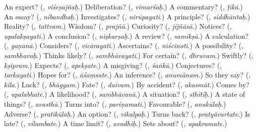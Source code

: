 \begin{tcolorbox}[breakable,colback=teal!4,colframe=teal!35!black,title={Before you move on}]
An expert? (\textbf{}, \emph{viśeṣajñaḥ}.) Deliberation? (\textbf{}, \emph{vimarśaḥ}.) A commentary? (\textbf{}, \emph{ṭīkā}.) An essay? (\textbf{}, \emph{nibandhaḥ}.) Investigates? (\textbf{}, \emph{nirūpayati}.) A principle? (\textbf{}, \emph{siddhāntaḥ}.) Reality? (\textbf{}, \emph{tattvam}.) Wisdom? (\textbf{}, \emph{prajñā}.) Curiosity? (\textbf{}, \emph{jijñāsā}.) Notices? (\textbf{}, \emph{upalakṣayati}.) A conclusion? (\textbf{}, \emph{niṣkarṣaḥ}.) A review? (\textbf{}, \emph{samīkṣā}.) A calculation? (\textbf{}, \emph{gaṇanā}.) Considers? (\textbf{}, \emph{vicārayati}.) Ascertains? (\textbf{}, \emph{niścinoti}.) A possibility? (\textbf{}, \emph{sambhavaḥ}.) Thinks likely? (\textbf{}, \emph{sambhāvayati}.) For certain? (\textbf{}, \emph{dhruvam}.) Swiftly? (\textbf{}, \emph{kṣipram}.) Expects? (\textbf{}, \emph{apekṣate}.) A misgiving? (\textbf{}, \emph{śaṅkā}.) Conjectures? (\textbf{}, \emph{tarkayati}.) Hopes for? (\textbf{}, \emph{āśaṃsate}.) An inference? (\textbf{}, \emph{anumānam}.) So they say? (\textbf{}, \emph{kila}.) Luck? (\textbf{}, \emph{bhāgyam}.) Fate? (\textbf{}, \emph{daivam}.) By accident? (\textbf{}, \emph{akasmāt}.) Comes by? (\textbf{}, \emph{upalabhate}.) A likelihood? (\textbf{}, \emph{sambhāvanā}.) A situation? (\textbf{}, \emph{sthitiḥ}.) A state of things? (\textbf{}, \emph{avasthā}.) Turns into? (\textbf{}, \emph{pariṇamati}.) Favourable? (\textbf{}, \emph{anukūlaḥ}.) Adverse? (\textbf{}, \emph{pratikūlaḥ}.) An option? (\textbf{}, \emph{vikalpaḥ}.) Turns back? (\textbf{}, \emph{pratyāvartate}.) Is late? (\textbf{}, \emph{vilambate}.) A time limit? (\textbf{}, \emph{avadhiḥ}.) Sets about? (\textbf{}, \emph{upakramate}.)
\end{tcolorbox}
